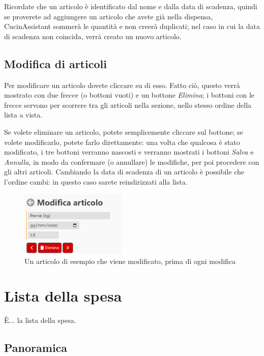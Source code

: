 \documentclass[12pt, a4paper]{report}
\begin{document}
    Ricordate che un articolo è identificato dal nome e dalla data di scadenza, quindi se proverete ad aggiungere un articolo che avete già nella
    dispensa, CucinAssistant sommerà le quantità e non creerà duplicati; nel caso in cui la data di scadenza non coincida, verrà creato un nuovo
    articolo.

    \section{Modifica di articoli}

    Per modificare un articolo dovete cliccare su di esso. Fatto ciò, questo verrà mostrato con due frecce (o bottoni vuoti) e un bottone
    \emph{Elimina}; i bottoni con le frecce servono per scorrere tra gli articoli nella sezione, nello stesso ordine della lista a vista.

    Se volete eliminare un articolo, potete semplicemente cliccare sul bottone; se volete modificarlo, potete farlo direttamente: una volta che
    qualcosa è stato modificato, i tre bottoni verranno nascosti e verranno mostrati i bottoni \emph{Salva} e \emph{Annulla}, in modo da confermare
    (o annullare) le modifiche, per poi procedere con gli altri articoli. Cambiando la data di scadenza di un articolo è possibile che l'ordine cambi: in questo caso sarete reindirizzati alla lista.

    \begin{figure}[H]
        \centering
        \includegraphics[width=0.45\textwidth]{assets/it/article.png}
        \caption{Un articolo di esempio che viene modificato, prima di ogni modifica}
    \end{figure}



    \chapter{Lista della spesa}

    È... la lista della spesa.

    \section{Panoramica}
\end{document}
